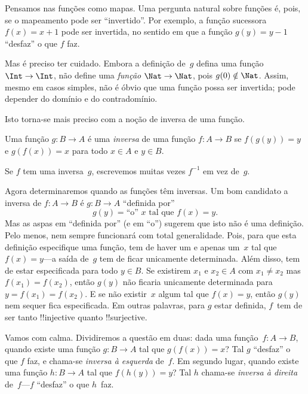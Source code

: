 \documentclass[../../../include/open-logic-section]{subfiles}
\begin{document}

\begin{explain}
Pensamos nas funções como mapas. Uma pergunta natural sobre
funções é, pois, se o mapeamento pode ser ``invertido''. Por
exemplo, a função sucessora $f(x) = x + 1$ pode ser invertida, no
sentido em que a função $g(y) = y - 1$ ``desfaz'' o que $f$ faz.

Mas é preciso ter cuidado. Embora a definição de~$g$ defina uma
função $\Int \to \Int$, não define uma \emph{função} $\Nat
\to \Nat$, pois $g(0) \notin \Nat$. Assim, mesmo em casos simples, não é
óbvio que uma função possa ser invertida; pode depender do
domínio e do contradomínio.

Isto torna-se mais preciso com a noção de inversa de uma função.
\end{explain}

\begin{defn}
Uma função $g \colon B \to A$ é uma \emph{inversa} de uma função $f
\colon A \to B$ se $f(g(y)) = y$ e $g(f(x)) = x$ para todo $x \in A$
e $y \in B$.
\end{defn}

Se $f$ tem uma inversa~$g$, escrevemos muitas vezes $f^{-1}$ em vez de~$g$.

\begin{explain}
Agora determinaremos quando as funções têm inversas. Um bom candidato
a inversa de $f\colon A \to B$ é $g\colon B \to A$ ``definida
por''
\[
g(y) = \text{``o'' $x$ tal que $f(x) = y$.}
\]
Mas as aspas em ``definida por'' (e em ``o'') sugerem que isto
não é uma definição. Pelo menos, nem sempre funcionará com
total generalidade. Pois, para que esta definição especifique uma
função, tem de haver um e apenas um~$x$ tal que $f(x) =
y$---a saída de~$g$ tem de ficar unicamente determinada. Além disso, tem
de estar especificada para todo $y \in B$. Se existirem $x_1$ e $x_2 \in
A$ com $x_1 \neq x_2$ mas $f(x_1) = f(x_2)$, então $g(y)$ não ficaria
unicamente determinada para $y = f(x_1) = f(x_2)$. E se não existir~$x$
algum tal que $f(x) = y$, então $g(y)$ nem sequer fica especificada. Em outras
palavras, para $g$ estar definida, $f$~tem de ser tanto !!{injective} quanto
!!{surjective}.

Vamos com calma. Dividiremos a questão em duas: dada uma
função~$f\colon A \to B$, quando existe uma função $g\colon B \to A$
tal que $g(f(x)) = x$? Tal $g$ ``desfaz'' o que $f$ faz, e chama-se
\emph{inversa à esquerda} de~$f$. Em segundo lugar, quando existe uma
função $h\colon B \to A$ tal que $f(h(y)) = y$? Tal $h$ chama-se
\emph{inversa à direita} de~$f$---$f$ ``desfaz'' o que $h$~faz.
\end{explain}
\end{document}
